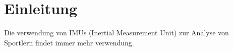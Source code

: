 \chapter{Einleitung}
Die verwendung von IMUs (Inertial Measurement Unit) zur Analyse von Sportlern findet immer mehr verwendung.

